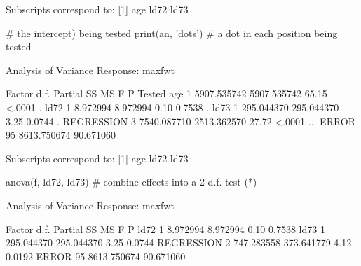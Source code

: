 \begin{Schunk}
\begin{Soutput}
Subscripts correspond to:
[1] age  ld72 ld73
\end{Soutput}
\begin{Sinput}
                       # the intercept) being tested
print(an, 'dots')      # a dot in each position being tested
\end{Sinput}
\begin{Soutput}
                Analysis of Variance          Response: maxfwt 

 Factor     d.f. Partial SS  MS          F     P      Tested
 age         1   5907.535742 5907.535742 65.15 <.0001 .     
 ld72        1      8.972994    8.972994  0.10 0.7538  .    
 ld73        1    295.044370  295.044370  3.25 0.0744   .   
 REGRESSION  3   7540.087710 2513.362570 27.72 <.0001 ...   
 ERROR      95   8613.750674   90.671060                    

Subscripts correspond to:
[1] age  ld72 ld73
\end{Soutput}
\begin{Sinput}
anova(f, ld72, ld73)   # combine effects into a 2 d.f. test (*\ipacue*)
\end{Sinput}
\begin{Soutput}
                Analysis of Variance          Response: maxfwt 

 Factor     d.f. Partial SS  MS         F    P     
 ld72        1      8.972994   8.972994 0.10 0.7538
 ld73        1    295.044370 295.044370 3.25 0.0744
 REGRESSION  2    747.283558 373.641779 4.12 0.0192
 ERROR      95   8613.750674  90.671060            
\end{Soutput}
\end{Schunk}
\ei
\def\apacue{0}
